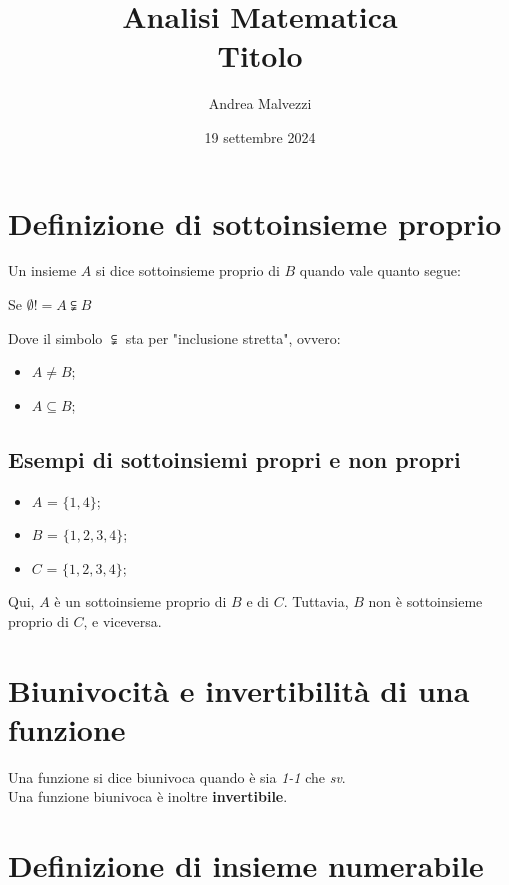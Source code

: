\documentclass[12pt]{article}
\title{\textbf{Analisi Matematica\\Titolo}}
\date{19 settembre 2024}
\author{Andrea Malvezzi}
\begin{document}
\maketitle
\pagebreak
\section{Definizione di sottoinsieme proprio}
Un insieme $A$ si dice sottoinsieme proprio di $B$ quando vale quanto segue:
\begin{center}
    Se $\emptyset != A \subsetneqq B$
\end{center}
Dove il simbolo $\subsetneqq$ sta per "inclusione stretta", ovvero:
\begin{itemize}
    \item $A \not= B$;
    \item $A \subseteq B$;
\end{itemize}
\subsection{Esempi di sottoinsiemi propri e non propri}
\begin{itemize}
    \item $A$ = $\{1, 4\}$;
    \item $B$ = $\{1, 2, 3, 4\}$;
    \item $C$ = $\{1, 2, 3, 4\}$;
\end{itemize}
Qui, $A$ è un sottoinsieme proprio di $B$ e di $C$. Tuttavia, $B$ non è sottoinsieme proprio di $C$, e viceversa.
\section{Biunivocità e invertibilità di una funzione}
Una funzione si dice biunivoca quando è sia \textit{1-1} che \textit{sv}.\\
Una funzione biunivoca è inoltre \textbf{invertibile}.
\section{Definizione di insieme numerabile}
\end{document}

